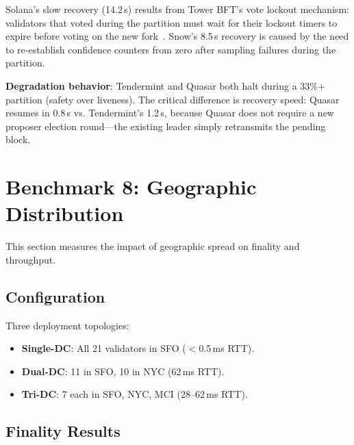 \documentclass[11pt]{article}
\begin{document}
Solana's slow recovery (14.2\,s) results from Tower BFT's vote lockout mechanism:
validators that voted during the partition must wait for their lockout timers to expire
before voting on the new fork~\cite{solana-wp}. Snow's 8.5\,s recovery is caused by the
need to re-establish confidence counters from zero after sampling failures during the
partition.

\textbf{Degradation behavior}: Tendermint and Quasar both halt during a 33\%+
partition (safety over liveness). The critical difference is recovery speed: Quasar
resumes in 0.8\,s vs. Tendermint's 1.2\,s, because Quasar does not require a new
proposer election round---the existing leader simply retransmits the pending block.

\section{Benchmark 8: Geographic Distribution}
\label{sec:geo}

This section measures the impact of geographic spread on finality and throughput.

\subsection{Configuration}

Three deployment topologies:

\begin{itemize}
\item \textbf{Single-DC}: All 21 validators in SFO ($<$0.5\,ms RTT).
\item \textbf{Dual-DC}: 11 in SFO, 10 in NYC (62\,ms RTT).
\item \textbf{Tri-DC}: 7 each in SFO, NYC, MCI (28--62\,ms RTT).
\end{itemize}

\subsection{Finality Results}
\end{document}
